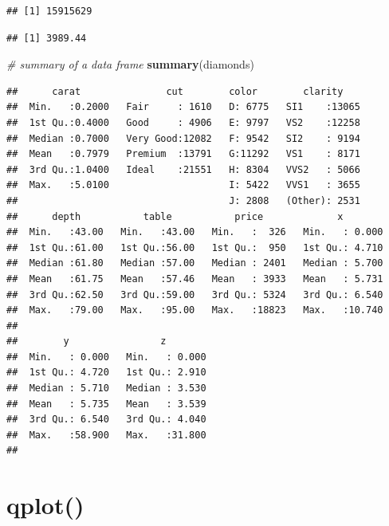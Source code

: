 \documentclass[]{book}
\newenvironment{Shaded}{\begin{snugshade}}{\end{snugshade}}
\newcommand{\KeywordTok}[1]{\textcolor[rgb]{0.13,0.29,0.53}{\textbf{{#1}}}}
\newcommand{\CommentTok}[1]{\textcolor[rgb]{0.56,0.35,0.01}{\textit{{#1}}}}
\newcommand{\NormalTok}[1]{{#1}}
\begin{document}
\begin{verbatim}
## [1] 15915629
\end{verbatim}

\begin{Shaded}
\end{Shaded}

\begin{verbatim}
## [1] 3989.44
\end{verbatim}

\begin{Shaded}
\begin{Highlighting}[]
\CommentTok{# summary of a data frame}
\KeywordTok{summary}\NormalTok{(diamonds)}
\end{Highlighting}
\end{Shaded}

\begin{verbatim}
##      carat               cut        color        clarity     
##  Min.   :0.2000   Fair     : 1610   D: 6775   SI1    :13065  
##  1st Qu.:0.4000   Good     : 4906   E: 9797   VS2    :12258  
##  Median :0.7000   Very Good:12082   F: 9542   SI2    : 9194  
##  Mean   :0.7979   Premium  :13791   G:11292   VS1    : 8171  
##  3rd Qu.:1.0400   Ideal    :21551   H: 8304   VVS2   : 5066  
##  Max.   :5.0100                     I: 5422   VVS1   : 3655  
##                                     J: 2808   (Other): 2531  
##      depth           table           price             x         
##  Min.   :43.00   Min.   :43.00   Min.   :  326   Min.   : 0.000  
##  1st Qu.:61.00   1st Qu.:56.00   1st Qu.:  950   1st Qu.: 4.710  
##  Median :61.80   Median :57.00   Median : 2401   Median : 5.700  
##  Mean   :61.75   Mean   :57.46   Mean   : 3933   Mean   : 5.731  
##  3rd Qu.:62.50   3rd Qu.:59.00   3rd Qu.: 5324   3rd Qu.: 6.540  
##  Max.   :79.00   Max.   :95.00   Max.   :18823   Max.   :10.740  
##                                                                  
##        y                z         
##  Min.   : 0.000   Min.   : 0.000  
##  1st Qu.: 4.720   1st Qu.: 2.910  
##  Median : 5.710   Median : 3.530  
##  Mean   : 5.735   Mean   : 3.539  
##  3rd Qu.: 6.540   3rd Qu.: 4.040  
##  Max.   :58.900   Max.   :31.800  
## 
\end{verbatim}

\section{qplot()}\label{qplot}
\end{document}
